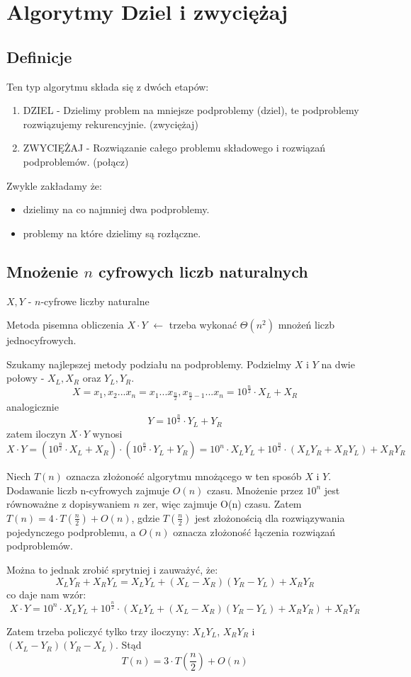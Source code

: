\section{Algorytmy Dziel i zwyciężaj}
\subsection{Definicje}
Ten typ algorytmu składa się z dwóch etapów:
\begin{enumerate}
	\item DZIEL - Dzielimy problem na mniejsze podproblemy (dziel), te podproblemy rozwiązujemy rekurencyjnie. (zwyciężaj)
	\item ZWYCIĘŻAJ - Rozwiązanie całego problemu składowego i rozwiązań podproblemów. (połącz)
\end{enumerate}

Zwykle zakładamy że:
\begin{itemize}
	\item dzielimy na co najmniej dwa podproblemy.
	\item problemy na które dzielimy są rozłączne.
\end{itemize}

\subsection{Mnożenie $n$ cyfrowych liczb naturalnych}
$X,Y$ - $n$-cyfrowe liczby naturalne

Metoda pisemna obliczenia $X \cdot Y$ $\leftarrow$ trzeba wykonać $\Theta(n^2)$ mnożeń liczb jednocyfrowych.

Szukamy najlepszej metody podziału na podproblemy. Podzielmy $X$ i $Y$ na dwie połowy - $X_L, X_R$ oraz $Y_L, Y_R$.
$$X = x_1,x_2...x_n = x_1...x_{\frac{n}{2}},x_{\frac{n}{2}-1}...x_n = 10^\frac{n}{2} \cdot X_L+X_R$$
analogicznie
$$Y = 10^\frac{n}{2} \cdot Y_L+Y_R$$
zatem iloczyn $X \cdot Y$ wynosi
$$X \cdot Y = (10^\frac{n}{2} \cdot X_L + X_R) \cdot (10^\frac{n}{2} \cdot Y_L + Y_R) = 10^n \cdot X_L Y_L + 10^\frac{n}{2} \cdot (X_L Y_R + X_R Y_L) + X_R Y_R $$

Niech $T(n)$ oznacza złożoność algorytmu mnożącego w ten sposób $X$ i $Y$. Dodawanie liczb n-cyfrowych zajmuje $O(n)$ czasu. Mnożenie przez $10^n$ jest równoważne z dopisywaniem $n$ zer, więc zajmuje O(n) czasu. Zatem $T(n) = 4 \cdot T(\frac{n}{2}) + O(n)$, gdzie $T(\frac{n}{2})$ jest złożonością dla rozwiązywania pojedynczego podproblemu, a $O(n)$ oznacza złożoność łączenia rozwiązań podproblemów.

Można to jednak zrobić sprytniej i zauważyć, że:
$$X_L Y_R + X_R Y_L =  X_L Y_L + (X_L - X_R)(Y_R - Y_L) +X_R Y_R$$
co daje nam wzór:
$$X \cdot Y = 10^n \cdot X_L Y_L + 10^\frac{n}{2} \cdot (X_L Y_L+ (X_L - X_R)(Y_R - Y_L) + X_R Y_R) + X_R Y_R $$

Zatem trzeba policzyć tylko trzy iloczyny: $X_L Y_L$, $X_R Y_R$ i $(X_L - Y_R)(Y_R - X_L)$. Stąd
$$T(n) = 3 \cdot T(\frac{n}{2}) + O(n)$$